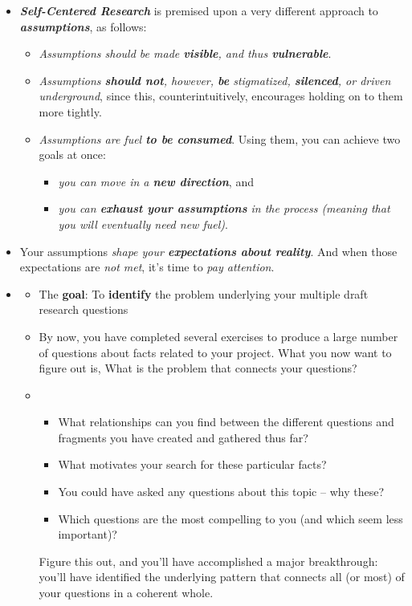 \documentclass[11pt]{article}
\begin{document}
\begin{itemize}
\item \emph{\textbf{Self-Centered Research}} is premised upon a very different approach to \emph{\textbf{assumptions}}, as follows:
\begin{itemize}
\item \emph{Assumptions should be made \textbf{visible}, and thus \textbf{vulnerable}}.

\item \emph{Assumptions \textbf{should not}, however, \textbf{be} stigmatized, \textbf{silenced}, or driven underground}, since this, counterintuitively, encourages holding on to them more tightly.

\item \emph{Assumptions are fuel \textbf{to be consumed}}. Using them, you can achieve two goals at once: 
\begin{itemize}
\item \emph{you can move in a \textbf{new direction}}, and
\item \emph{you can \textbf{exhaust your assumptions} in the process (meaning that you will eventually need new fuel)}.
\end{itemize}
\end{itemize}

\item Your assumptions \emph{shape your \textbf{expectations about reality}}. And when those expectations are \emph{not met}, it’s time to \emph{pay attention}.

\item \begin{exercise}
\begin{itemize}
\item The \textbf{goal}: To \textbf{identify} the problem underlying your multiple draft research questions

\item By now, you have completed several exercises to produce a large number of questions about facts related to your project. What you now want to figure out is, What is the problem that connects your questions?

\item \begin{itemize}
\item What relationships can you find between the different questions and fragments you have created and gathered thus far? 
\item What motivates your search for these particular facts? 
\item You could have asked any questions about this topic -- why these?
\item Which questions are the most compelling to you (and which seem less important)? 
\end{itemize} Figure this out, and you’ll have accomplished a major breakthrough: you’ll have identified the underlying pattern that connects all (or most) of your questions in a coherent whole. 


\end{itemize}
\end{exercise}
\end{itemize}
\end{document}
